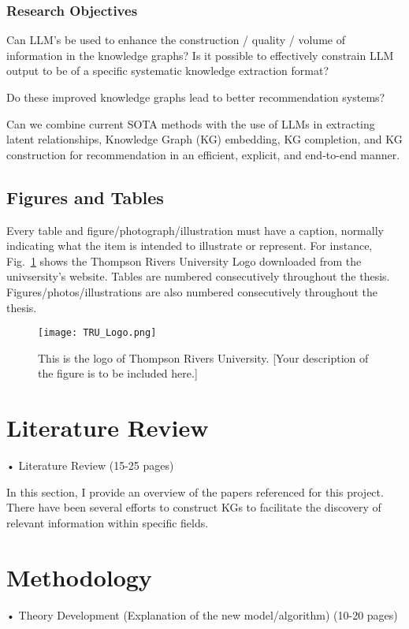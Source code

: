 \documentclass[a4paper]{article}
\begin{document}
\subsection{Research Objectives}
\item Can LLM's be used to enhance the construction / quality / volume of information in the knowledge graphs? Is it possible to effectively constrain LLM output to be of a specific systematic knowledge extraction format?
\item Do these improved knowledge graphs lead to better recommendation systems? 
\item Can we combine current SOTA methods with the use of LLMs in extracting latent relationships, Knowledge Graph (KG) embedding, KG completion, and KG construction for recommendation in an efficient, explicit, and end-to-end manner.


\section{Figures and Tables}
Every table and figure/photograph/illustration must have a caption, normally indicating what the item is intended to illustrate or represent. For instance, Fig.~\ref{fig1} shows the Thompson Rivers University Logo downloaded from the univsersity's website. 
Tables are numbered consecutively throughout the thesis.
Figures/photos/illustrations are also numbered consecutively throughout the thesis.

\begin{figure}
\texttt{[image: TRU\_Logo.png]}
\caption{This is the logo of Thompson Rivers University. [Your description of the figure is to be included here.]} \label{fig1}
\end{figure}

\chapter{Literature Review}


• Literature Review (15-25 pages)

In this section, I provide an overview of the papers referenced for this project.
There have been several efforts to construct KGs to facilitate the discovery of relevant information within specific fields.


\chapter{Methodology}
• Theory Development (Explanation of the new model/algorithm) (10-20 pages)
\end{document}
